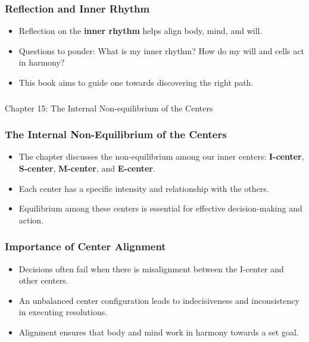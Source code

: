 \begin{frame}[fragile]\frametitle{Reflection and Inner Rhythm}
    \begin{itemize}
        \item Reflection on the \textbf{inner rhythm} helps align body, mind, and will.
        \item Questions to ponder: What is my inner rhythm? How do my will and cells act in harmony?
        \item This book aims to guide one towards discovering the right path.
    \end{itemize}
\end{frame}


\begin{frame}[fragile]\frametitle{}
\begin{center}
{\Large Chapter 15: The Internal Non-equilibrium of the Centers  }
\end{center}
\end{frame}

\begin{frame}[fragile]\frametitle{The Internal Non-Equilibrium of the Centers}
    \begin{itemize}
        \item The chapter discusses the non-equilibrium among our inner centers: \textbf{I-center}, \textbf{S-center}, \textbf{M-center}, and \textbf{E-center}.
        \item Each center has a specific intensity and relationship with the others.
        \item Equilibrium among these centers is essential for effective decision-making and action.
    \end{itemize}
\end{frame}

\begin{frame}[fragile]\frametitle{Importance of Center Alignment}
    \begin{itemize}
        \item Decisions often fail when there is misalignment between the I-center and other centers.
        \item An unbalanced center configuration leads to indecisiveness and inconsistency in executing resolutions.
        \item Alignment ensures that body and mind work in harmony towards a set goal.
    \end{itemize}
\end{frame}

